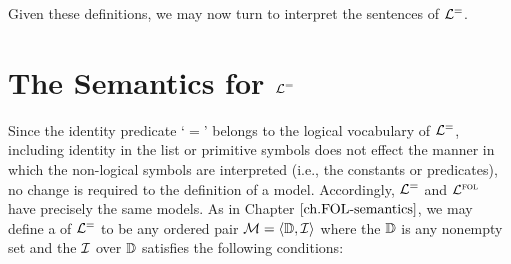 
Given these definitions, we may now turn to interpret the sentences of $\mathcal{L}^{=}$. 





\section{The Semantics for $\mathcal{L}^{=}$}%
  \label{sec:FI-Semantics}
  
Since the identity predicate `$=$' belongs to the logical vocabulary of $\mathcal{L}^{=}$, including identity in the list or primitive symbols does not effect the manner in which the non-logical symbols are interpreted (i.e., the constants or predicates), no change is required to the definition of a model.
Accordingly, $\mathcal{L}^{=}$ and $\mathcal{L}^{\textsc{fol}}$ have precisely the same models. 
As in Chapter $\ref{ch.FOL-semantics}$, we may define a  of $\mathcal{L}^{=}$ to be any ordered pair $\mathcal{M}=\langle\mathbb{D},\mathcal{I}\rangle$ where the  $\mathbb{D}$ is any nonempty set and the  $\mathcal{I}$ over $\mathbb{D}$ satisfies the following conditions:%

